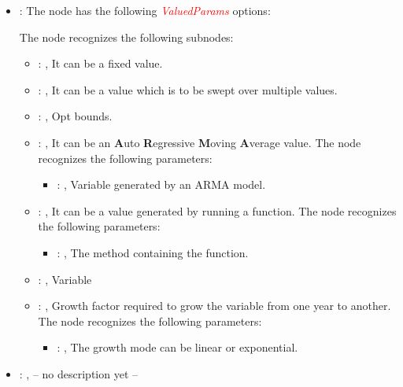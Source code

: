 \begin{itemize}
    \item {}:
      The node  has the following \textcolor{red}{\textit{ValuedParams}}
      options:

      The  node recognizes the following subnodes:
      \begin{itemize}
        \item {}: , 
          It can be a fixed value.

        \item {}: , 
          It can be a value which is to be swept over multiple values.

        \item {}: , 
          Opt bounds.

        \item {}: , 
          It can be an \textbf{A}uto \textbf{R}egressive \textbf{M}oving \textbf{A}verage value.
          The  node recognizes the following parameters:
            \begin{itemize}
              \item {}: , 
                Variable generated by an ARMA model.
          \end{itemize}

        \item {}: , 
          It can be a value generated by running a function.
          The  node recognizes the following parameters:
            \begin{itemize}
              \item {}: , 
                The method containing the function.
          \end{itemize}

        \item {}: , 
          Variable

        \item {}: , 
          Growth factor required to grow the variable from one year to another.
          The  node recognizes the following parameters:
            \begin{itemize}
              \item {}: , 
                The growth mode can be linear or exponential.
          \end{itemize}
      \end{itemize}

    \item {}: , 
      -- no description yet --
  \end{itemize}
